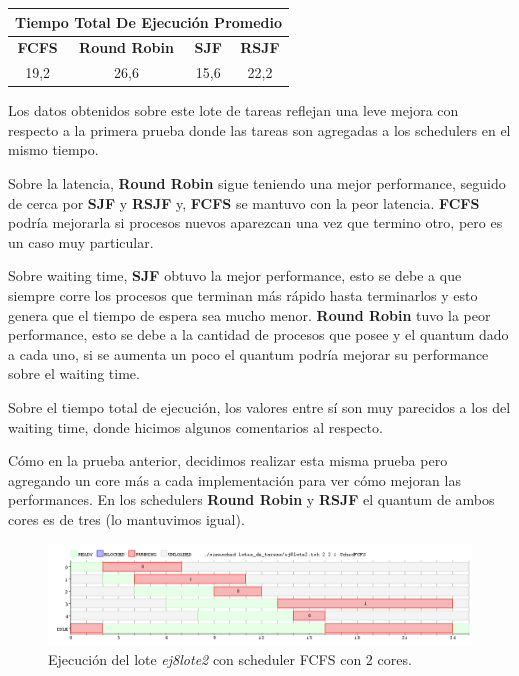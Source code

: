 \begin{center}
	\begin{tabular}{|c|c|c|c|}
		\hline
		\multicolumn{4}{|c|}{\large{\textbf{Tiempo Total De Ejecución Promedio}}} \\
		\hline
		\textbf{FCFS} & \textbf{Round Robin} & \textbf{SJF} & \textbf{RSJF} \\
		\hline
		19,2 & 26,6 & 15,6 & 22,2 \\
		\hline
	\end{tabular}
\end{center}

Los datos obtenidos sobre este lote de tareas reflejan una leve mejora con respecto a la primera prueba donde las tareas son agregadas a los schedulers en el mismo tiempo.

Sobre la latencia, \textbf{Round Robin} sigue teniendo una mejor performance, seguido de cerca por \textbf{SJF} y \textbf{RSJF} y, \textbf{FCFS} se mantuvo con la peor latencia. \textbf{FCFS} podría mejorarla si procesos nuevos aparezcan una vez que termino otro, pero es un caso muy particular.

Sobre waiting time, \textbf{SJF} obtuvo la mejor performance, esto se debe a que siempre corre los procesos que terminan más rápido hasta terminarlos y esto genera que el tiempo de espera sea mucho menor. \textbf{Round Robin} tuvo la peor performance, esto se debe a la cantidad de procesos que posee y el quantum dado a cada uno, si se aumenta un poco el quantum podría mejorar su performance sobre el waiting time.

Sobre el tiempo total de ejecución, los valores entre sí son muy parecidos a los del waiting time, donde hicimos algunos comentarios al respecto.

Cómo en la prueba anterior, decidimos realizar esta misma prueba pero agregando un core más a cada implementación para ver cómo mejoran las performances. En los schedulers \textbf{Round Robin} y \textbf{RSJF} el quantum de ambos cores es de tres (lo mantuvimos igual).

\begin{figure}[!h]
	\begin{center}
		\includegraphics[width=500px]{imagenes/ej8_prueba2_fcfs2.png}
		\caption{Ejecución del lote \emph{ej8lote2} con scheduler FCFS con 2 cores.}
		\label{fig:grafico_ej8_prueba2_fcfs2}
	\end{center}
\end{figure}

